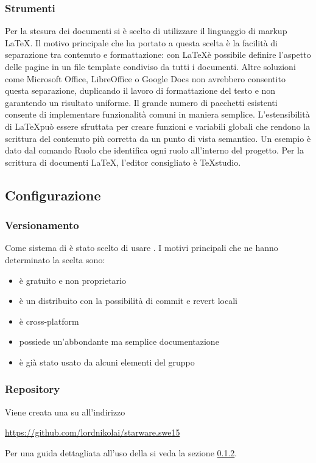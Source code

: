 \documentclass[12pt,a4paper]{article}
\begin{document}
\subsubsection{Strumenti}
Per la stesura dei documenti si è scelto di utilizzare il linguaggio di markup \LaTeX. Il motivo principale che ha portato a questa scelta è la facilità di separazione tra contenuto e formattazione: con \LaTeX è possibile definire l’aspetto delle pagine in un file template condiviso da tutti i documenti. Altre soluzioni come Microsoft Office, LibreOffice o Google Docs non avrebbero consentito questa separazione, duplicando il lavoro di formattazione del testo e non garantendo un risultato uniforme. Il grande numero di pacchetti esistenti consente di implementare funzionalità comuni in maniera semplice. L’estensibilità di \LaTeX può essere sfruttata per creare funzioni e variabili globali che rendono la scrittura del contenuto più corretta da un punto di vista semantico. Un esempio è dato dal comando Ruolo che identifica ogni ruolo all’interno del progetto. Per la scrittura di documenti \LaTeX, l’editor consigliato è TeXstudio.

\subsection{Configurazione} %

\subsubsection{Versionamento}\label{versionamento} %
Come sistema di  è stato scelto di usare . I motivi principali che ne hanno determinato la scelta sono:
\begin{itemize}
	\item è gratuito e non proprietario
	\item è un  distribuito con la possibilità di commit e revert locali
	\item è cross-platform
	\item possiede un'abbondante ma semplice documentazione
	\item è già stato usato da alcuni elementi del gruppo
\end{itemize}

\subsubsection{Repository} \label{sec:rep} %
Viene creata una  su  all'indirizzo 
\begin{center}
	\url{https://github.com/lordnikolai/starware.swe15}
\end{center}
Per una guida dettagliata all'uso della  si veda la sezione \ref{sec:rep}.
\end{document}
